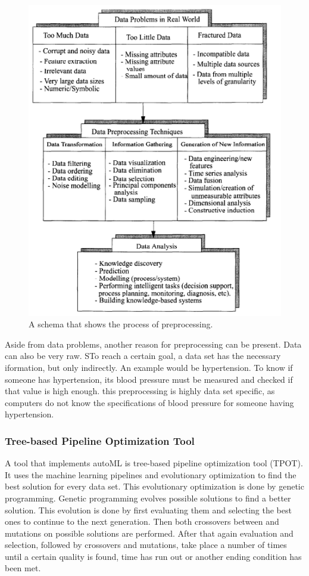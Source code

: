 \documentclass[10pt,a4paper]{article}
\begin{document}
 	\begin{figure}[h!]
 		\includegraphics[scale=1]{DataPreprocessing.png}
 		\caption{A schema that shows the process of preprocessing. \cite{famili1997data}}
 		\label{fig:DataPreprocessing}
 	\end{figure}
 	
 	Aside from data problems, another reason for preprocessing can be present. \cite{famili1997data} Data can also be very raw. STo reach a certain goal, a data set has the necessary iformation, but only indirectly. An example would be hypertension. To know if someone has hypertension, its blood pressure must be measured and checked if that value is high enough. this preprocessing is highly data set specific, as computers do not know the specifications of blood pressure for someone having hypertension. 
 	
	\subsubsection{Tree-based Pipeline Optimization Tool}
	\label{subsec:TPOT}
	
	A tool that implements autoML is tree-based pipeline optimization tool (TPOT). It uses the machine learning pipelines and evolutionary optimization to find the best solution for every data set. This evolutionary optimization is done by genetic programming. Genetic programming evolves possible solutions to find a better solution. This evolution is done by first evaluating them and selecting the best ones to continue to the next generation. Then both crossovers between and mutations on possible solutions are performed. After that again evaluation and selection, followed by crossovers and mutations, take place a number of times until a certain quality is found, time has run out or another ending condition has been met.
	
\end{document}
